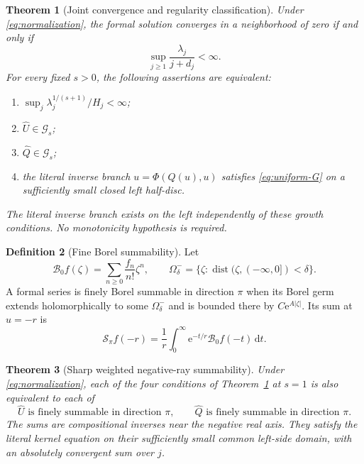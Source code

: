 \documentclass[11pt,a4paper]{article}
\numberwithin{equation}{section}
\newtheorem{theorem}{Theorem}[section]
\theoremstyle{definition}
\newtheorem{definition}[theorem]{Definition}
\theoremstyle{remark}
\theoremstyle{definition}
\newcommand{\U}{\widehat U}
\newcommand{\Q}{\widehat Q}
\newcommand{\Gev}{\mathcal G}
\newcommand{\B}{\mathcal B_0}
\newcommand{\e}{\mathrm e}
\newcommand{\dd}{\mathrm d}
\newcommand{\dist}{\operatorname{dist}}
\begin{document}
\begin{theorem}[Joint convergence and regularity classification]
\label{thm:classification}
Under \eqref{eq:normalization}, the formal solution converges in a
neighborhood of zero if and only if
\begin{equation}
 \sup_{j\ge1}\frac{\lambda_j}{j+d_j}<\infty.
 \label{eq:analytic-criterion}
\end{equation}
For every fixed $s>0$, the following assertions are equivalent:
\begin{enumerate}[label=(\roman*)]
 \item $\displaystyle\sup_j\lambda_j^{1/(s+1)}/H_j<\infty$;
 \item $\U\in\Gev_s$;
 \item $\Q\in\Gev_s$;
 \item the literal inverse branch $u=\Phi(Q(u),u)$ satisfies
       \eqref{eq:uniform-G} on a sufficiently small closed left half-disc.
\end{enumerate}
The literal inverse branch exists on the left independently of these
growth conditions. No monotonicity hypothesis is required.
\end{theorem}

\begin{definition}[Fine Borel summability]
Let
\[
 \B f(\zeta)=\sum_{n\ge0}\frac{f_n}{n!}\zeta^n,
 \qquad
 \Omega^-_\delta=\{\zeta:\dist(\zeta,(-\infty,0])<\delta\}.
\]
A formal series is finely Borel summable in direction $\pi$ when its
Borel germ extends holomorphically to some $\Omega^-_\delta$ and is bounded
there by $C\e^{A|\zeta|}$. Its sum at $u=-r$ is
\begin{equation}
 \mathcal S_\pi f(-r)=\frac1r\int_0^\infty
                 \e^{-t/r}\B f(-t)\,\dd t.
 \label{eq:laplace}
\end{equation}
\end{definition}

\begin{theorem}[Sharp weighted negative-ray summability]
\label{thm:fine}
Under \eqref{eq:normalization}, each of the four conditions of
Theorem~\ref{thm:classification} at $s=1$ is also equivalent to each of
\[
 \U\text{ is finely summable in direction }\pi,
 \qquad
 \Q\text{ is finely summable in direction }\pi.
\]
The sums are compositional inverses near the negative real axis. They
satisfy the literal kernel equation on their sufficiently small common
left-side domain, with an absolutely convergent sum over $j$.
\end{theorem}
\end{document}
